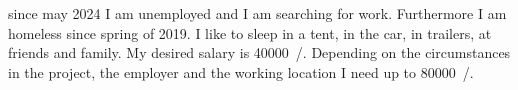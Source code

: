 \versionLanguageStart%
		since may 2024 I am unemployed and I am searching for work.
		Furthermore I am homeless since spring of 2019.
		I like to sleep in a tent, in the car, in trailers, at friends and family.
		My desired salary is \SI{40000}{\sieuro/\year}.
		Depending on the circumstances in the project, the employer and the working location I need up to \SI{80000}{\sieuro/\year}.
\versionLanguageEnd